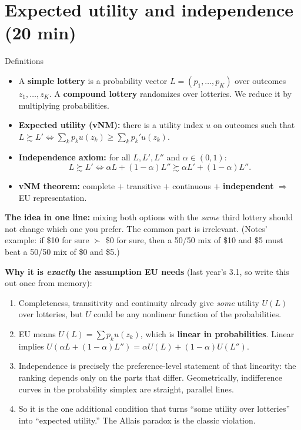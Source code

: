 \documentclass[11pt]{article}
\begin{document}
\section{Expected utility and independence (20 min)}

\begin{defbox}{Definitions}
\begin{itemize}
\item A \textbf{simple lottery} is a probability vector $L=(p_1,\dots,p_K)$ over outcomes $z_1,\dots,z_K$. A \textbf{compound lottery} randomizes over lotteries. We reduce it by multiplying probabilities.
\item \textbf{Expected utility (vNM):} there is a utility index $u$ on outcomes such that $L\succsim L'\iff\sum_k p_k u(z_k)\ge\sum_k p_k' u(z_k)$.
\item \textbf{Independence axiom:} for all $L,L',L''$ and $\alpha\in(0,1)$:
\[L\succsim L'\iff \alpha L+(1-\alpha)L''\succsim\alpha L'+(1-\alpha)L''.\]
\item \textbf{vNM theorem:} complete $+$ transitive $+$ continuous $+$ \textbf{independent} $\Rightarrow$ EU representation.
\end{itemize}
\end{defbox}

\textbf{The idea in one line:} mixing both options with the \emph{same} third lottery should not change which one you prefer. The common part is irrelevant. (Notes' example: if \$10 for sure $\succ$ \$0 for sure, then a 50/50 mix of \$10 and \$5 must beat a 50/50 mix of \$0 and \$5.)

\textbf{Why it is \emph{exactly} the assumption EU needs} (last year's 3.1, so write this out once from memory):
\begin{enumerate}
\item Completeness, transitivity and continuity already give \emph{some} utility $U(L)$ over lotteries, but $U$ could be any nonlinear function of the probabilities.
\item EU means $U(L)=\sum p_k u(z_k)$, which is \textbf{linear in probabilities}. Linear implies $U(\alpha L+(1-\alpha)L'')=\alpha U(L)+(1-\alpha)U(L'')$.
\item Independence is precisely the preference-level statement of that linearity: the ranking depends only on the parts that differ. Geometrically, indifference curves in the probability simplex are straight, parallel lines.
\item So it is the one additional condition that turns ``some utility over lotteries'' into ``expected utility.'' The Allais paradox is the classic violation.
\end{enumerate}
\end{document}
